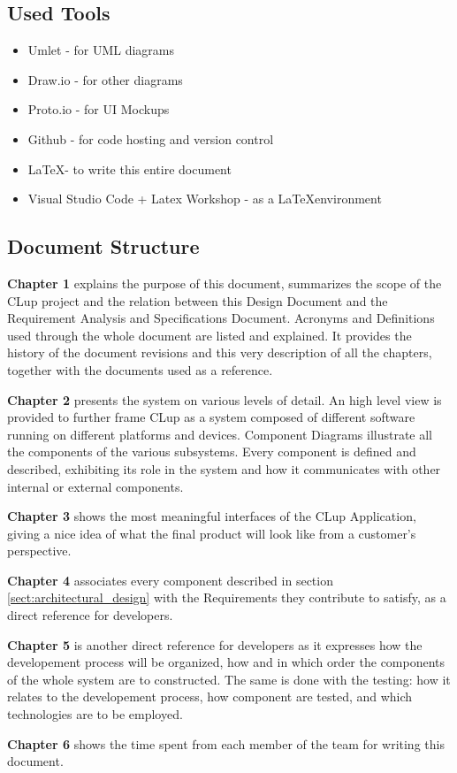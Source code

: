 \subsection{Used Tools}
\begin{itemize}
    \item Umlet - for UML diagrams
    \item Draw.io - for other diagrams
    \item Proto.io - for UI Mockups
    \item Github - for code hosting and version control
    \item \LaTeX \space  - to write this entire document
    \item Visual Studio Code + Latex Workshop - as a \LaTeX \space environment
\end{itemize}

\clearpage

\subsection{Document Structure}

\textbf{Chapter 1} explains the purpose of this document, summarizes the scope of the CLup project and the relation between this Design Document and the Requirement Analysis and Specifications Document.
Acronyms and Definitions used through the whole document are listed and explained.
It provides the history of the document revisions and this very description of all the chapters, together with the documents used as a reference.

\medskip

\textbf{Chapter 2} presents the system on various levels of detail. An high level view is provided to further frame CLup as a system composed of different software running on different platforms and devices. Component Diagrams illustrate all the components of the various subsystems. Every component is defined and described, exhibiting its role in the system and how it communicates with other internal or external components.

\medskip

\textbf{Chapter 3} shows the most meaningful interfaces of the CLup Application, giving a nice idea of what the final product will look like from a customer's perspective.

\medskip


\textbf{Chapter 4} associates every component described in section \ref{sect:architectural_design} with the Requirements they contribute to satisfy, as a direct reference for developers.

\medskip


\textbf{Chapter 5} is another direct reference for developers as it expresses how the developement process will be organized, how and in which order the components of the whole system are to constructed. The same is done with the testing: how it relates to the developement process, how component are tested, and which technologies are to be employed.

\medskip

\textbf{Chapter 6} shows the time spent from each member of the team for writing this document.